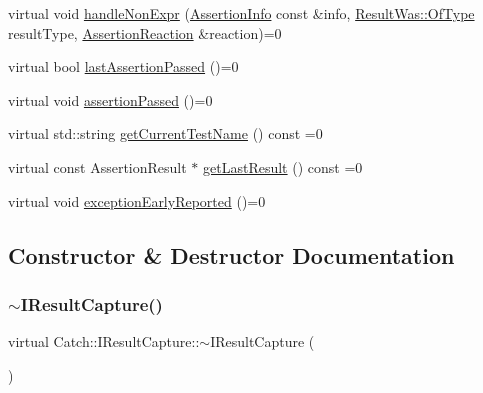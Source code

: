 \begin{DoxyCompactItemize}
\item 
virtual void \mbox{\hyperlink{struct_catch_1_1_i_result_capture_ab7dbdf8aa28427119583e24dbb302c63}{handle\+Non\+Expr}} (\mbox{\hyperlink{struct_catch_1_1_assertion_info}{Assertion\+Info}} const \&info, \mbox{\hyperlink{struct_catch_1_1_result_was_a624e1ee3661fcf6094ceef1f654601ef}{Result\+Was\+::\+Of\+Type}} result\+Type, \mbox{\hyperlink{struct_catch_1_1_assertion_reaction}{Assertion\+Reaction}} \&reaction)=0
\item 
virtual bool \mbox{\hyperlink{struct_catch_1_1_i_result_capture_a973435fbdcb2f6f07a0ec5719a01e956}{last\+Assertion\+Passed}} ()=0
\item 
virtual void \mbox{\hyperlink{struct_catch_1_1_i_result_capture_a9b0ef2cb071e9a9dc6ec1b533026aea7}{assertion\+Passed}} ()=0
\item 
virtual std\+::string \mbox{\hyperlink{struct_catch_1_1_i_result_capture_aea1617f4a84cc648246aa3ed6918b5bf}{get\+Current\+Test\+Name}} () const =0
\item 
virtual const Assertion\+Result $\ast$ \mbox{\hyperlink{struct_catch_1_1_i_result_capture_ab18872c89fab97405a56e9c6a4919736}{get\+Last\+Result}} () const =0
\item 
virtual void \mbox{\hyperlink{struct_catch_1_1_i_result_capture_ae63ecec95db4c236c63ecf616f483810}{exception\+Early\+Reported}} ()=0
\end{DoxyCompactItemize}


\subsection{Constructor \& Destructor Documentation}
\mbox{\label{struct_catch_1_1_i_result_capture_a3bd16719d6772b7470887fc36c6d0808}} 
\subsubsection{\texorpdfstring{$\sim$IResultCapture()}{~IResultCapture()}}
{\footnotesize\ttfamily virtual Catch\+::\+I\+Result\+Capture\+::$\sim$\+I\+Result\+Capture (\begin{DoxyParamCaption}{ }\end{DoxyParamCaption})\hspace{0.3cm}{\ttfamily [virtual]}}



